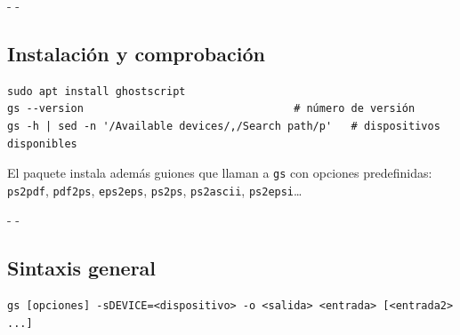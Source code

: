 \documentclass[11pt,a4paper]{article}
\makeatletter
\newcommand{\necesitaespacio}[1]{\par\penalty-100\begingroup
	\setlength{\dimen@}{#1}\dimen@ii\pagegoal\advance\dimen@ii-\pagetotal
	\ifdim\dimen@>\dimen@ii\ifdim\dimen@ii>\z@\vfil\fi\penalty-\@M\fi\endgroup}
\newcommand{\cmd}[1]{\texttt{\textcolor{colcmd}{#1}}}      %
\makeatother
\begin{document}
	\necesitaespacio{8\baselineskip}
	\subsection{Instalación y comprobación}
	
	\begin{lstlisting}
sudo apt install ghostscript
gs --version                                 # número de versión
gs -h | sed -n '/Available devices/,/Search path/p'   # dispositivos disponibles
\end{lstlisting}
	
	El paquete instala además guiones que llaman a \cmd{gs} con opciones predefinidas: \cmd{ps2pdf}, \cmd{pdf2ps}, \cmd{eps2eps}, \cmd{ps2ps}, \cmd{ps2ascii}, \cmd{ps2epsi}\ldots
	
	\necesitaespacio{8\baselineskip}
	\subsection{Sintaxis general}
	
	\begin{lstlisting}[style=sintaxis]
gs [opciones] -sDEVICE=<dispositivo> -o <salida> <entrada> [<entrada2> ...]
\end{lstlisting}
	
\end{document}
